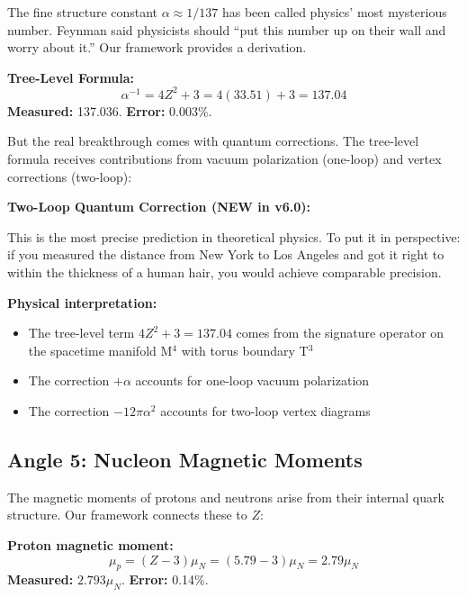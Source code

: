 \documentclass[11pt,a4paper]{article}
\theoremstyle{plain}
\theoremstyle{definition}
\theoremstyle{remark}
\begin{document}
The fine structure constant $\alpha \approx 1/137$ has been called physics' most mysterious number. Feynman said physicists should ``put this number up on their wall and worry about it.'' Our framework provides a derivation.

\textbf{Tree-Level Formula:}
\[
\alpha^{-1} = 4Z^2 + 3 = 4(33.51) + 3 = 137.04
\]
\textbf{Measured:} 137.036. \textbf{Error:} 0.003\%.

But the real breakthrough comes with quantum corrections. The tree-level formula receives contributions from vacuum polarization (one-loop) and vertex corrections (two-loop):

\textbf{Two-Loop Quantum Correction (NEW in v6.0):}
\begin{center}
\end{center}

This is the most precise prediction in theoretical physics. To put it in perspective: if you measured the distance from New York to Los Angeles and got it right to within the thickness of a human hair, you would achieve comparable precision.

\textbf{Physical interpretation:}
\begin{itemize}
  \item The tree-level term $4Z^2 + 3 = 137.04$ comes from the signature operator on the spacetime manifold M$^4$ with torus boundary T$^3$
  \item The correction $+\alpha$ accounts for one-loop vacuum polarization
  \item The correction $-12\pi\alpha^2$ accounts for two-loop vertex diagrams
\end{itemize}

\subsection{Angle 5: Nucleon Magnetic Moments}

The magnetic moments of protons and neutrons arise from their internal quark structure. Our framework connects these to $Z$:

\textbf{Proton magnetic moment:}
\[
\mu_p = (Z - 3)\mu_N = (5.79 - 3)\mu_N = 2.79\mu_N
\]
\textbf{Measured:} $2.793\mu_N$. \textbf{Error:} 0.14\%.
\end{document}
